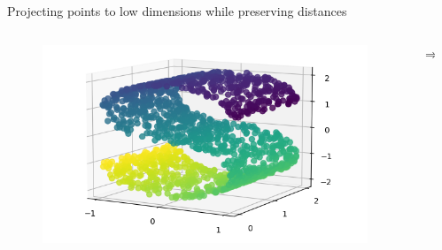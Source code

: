 \documentclass{beamer}
\begin{document}
\begin{frame}{Projecting points to low dimensions while preserving distances}
    \begin{columns}
        \begin{column}{0.4\textwidth}
            \begin{figure}
                \includegraphics[width=1.4\textwidth]{standalone/mds_1.png}
                
            \end{figure}   
        \end{column}
        \begin{column}{0.01\textwidth}
            \huge{$\Longrightarrow$}
            
        \end{column}
        \begin{column}{0.4\textwidth}
            
        \end{column}
    \end{columns}
    \centering
    \vfill
    \tiny{\cite{scikit-learn}}
\end{frame}
\end{document}
